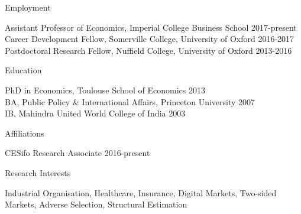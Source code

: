 \documentclass{resume}
\begin{document}
\begin{rSection}{Employment}

Assistant Professor of Economics, Imperial College Business School \hfill {2017-present} 
\\ Career Development Fellow, Somerville College, University of Oxford \hfill {2016-2017} 
\\ Postdoctoral Research Fellow, Nuffield College, University of Oxford \hfill {2013-2016} 	
	
\end{rSection}











\begin{rSection}{Education}

PhD in Economics, Toulouse School of Economics \hfill {2013} 
\\ BA, Public Policy \& International Affairs, Princeton University \hfill {2007}
\\ IB, Mahindra United World College of India \hfill{2003}

\end{rSection}








\begin{rSection}{Affiliations}

CESifo Research Associate \hfill {2016-present} 
	
\end{rSection}









\begin{rSection}{Research Interests}

Industrial Organisation, Healthcare, Insurance, Digital Markets, Two-sided Markets, Adverse Selection, Structural Estimation
	
\end{rSection}
\end{document}
